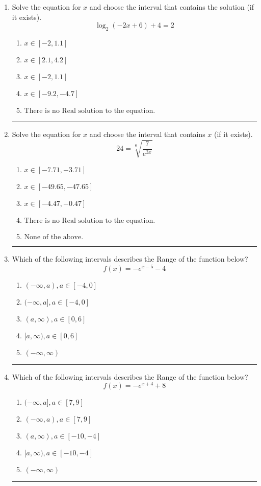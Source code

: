 \documentclass[14pt]{extbook}
\newcommand{\litem}[1]{\item#1\hspace*{-1cm}\rule{\textwidth}{0.4pt}}
\begin{document}
\begin{enumerate}
\litem{
Solve the equation for $x$ and choose the interval that contains the solution (if it exists).\[ \log_{2}{(-2x+6)}+4 = 2 \]\begin{enumerate}[label=\Alph*.]
\item \( x \in [-2, 1.1] \)
\item \( x \in [2.1, 4.2] \)
\item \( x \in [-2, 1.1] \)
\item \( x \in [-9.2, -4.7] \)
\item \( \text{There is no Real solution to the equation.} \)

\end{enumerate} }
\litem{
 Solve the equation for $x$ and choose the interval that contains $x$ (if it exists).\[  24 = \sqrt[6]{\frac{7}{e^{3x}}} \]\begin{enumerate}[label=\Alph*.]
\item \( x \in [-7.71, -3.71] \)
\item \( x \in [-49.65, -47.65] \)
\item \( x \in [-4.47, -0.47] \)
\item \( \text{There is no Real solution to the equation.} \)
\item \( \text{None of the above.} \)

\end{enumerate} }
\litem{
Which of the following intervals describes the Range of the function below?\[ f(x) = -e^{x-5}-4 \]\begin{enumerate}[label=\Alph*.]
\item \( (-\infty, a), a \in [-4, 0] \)
\item \( (-\infty, a], a \in [-4, 0] \)
\item \( (a, \infty), a \in [0, 6] \)
\item \( [a, \infty), a \in [0, 6] \)
\item \( (-\infty, \infty) \)

\end{enumerate} }
\litem{
Which of the following intervals describes the Range of the function below?\[ f(x) = -e^{x+4}+8 \]\begin{enumerate}[label=\Alph*.]
\item \( (-\infty, a], a \in [7, 9] \)
\item \( (-\infty, a), a \in [7, 9] \)
\item \( (a, \infty), a \in [-10, -4] \)
\item \( [a, \infty), a \in [-10, -4] \)
\item \( (-\infty, \infty) \)


\end{enumerate}}
\end{enumerate}
\end{document}
